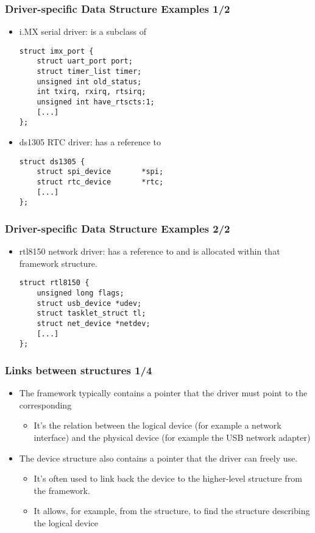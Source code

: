 \begin{frame}[fragile]
  \frametitle{Driver-specific Data Structure Examples 1/2}
  \begin{itemize}
  \item i.MX serial driver:  is a subclass of
  \begin{verbatim}
struct imx_port {
    struct uart_port port;
    struct timer_list timer;
    unsigned int old_status;
    int txirq, rxirq, rtsirq;
    unsigned int have_rtscts:1;
    [...]
};
  \end{verbatim}
  \item ds1305 RTC driver:  has a reference to
  \begin{verbatim}
struct ds1305 {
    struct spi_device       *spi;
    struct rtc_device       *rtc;
    [...]
};
  \end{verbatim}
  \end{itemize}
\end{frame}

\begin{frame}[fragile]
  \frametitle{Driver-specific Data Structure Examples 2/2}
  \begin{itemize}
  \item rtl8150 network driver:  has a reference to
     and is allocated within that framework structure.
  \begin{verbatim}
struct rtl8150 {
    unsigned long flags;
    struct usb_device *udev;
    struct tasklet_struct tl;
    struct net_device *netdev;
    [...]
};
  \end{verbatim}
  \end{itemize}
\end{frame}

\begin{frame}
  \frametitle{Links between structures 1/4}
  \begin{itemize}
  \item The framework typically contains a  \code{*}
    pointer that the driver must point to the corresponding
    \begin{itemize}
    \item It's the relation between the logical device (for example a
      network interface) and the physical device (for example the USB
      network adapter)
    \end{itemize}
  \item The device structure also contains a  pointer
    that the driver can freely use.
    \begin{itemize}
    \item It's often used to link back the device to the higher-level
      structure from the framework.
    \item It allows, for example, from the 
      structure, to find the structure describing the logical device
    \end{itemize}
  \end{itemize}
\end{frame}

